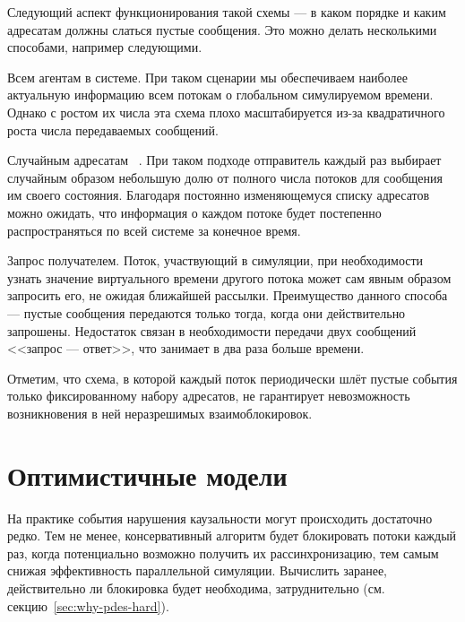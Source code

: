 Следующий аспект функционирования такой схемы — в каком порядке  и каким адресатам должны слаться пустые сообщения. Это можно делать несколькими способами, например следующими.

\begin{description*}
\item[Всем агентам в системе.] При таком сценарии мы обеспечиваем наиболее актуальную информацию всем потокам о глобальном симулируемом времени. Однако с ростом их числа эта схема плохо масштабируется из-за квадратичного роста числа передаваемых сообщений.

\item[Случайным адресатам]~\cite{graphite2010}. При таком подходе отправитель каждый раз выбирает случайным образом небольшую долю от полного числа потоков для сообщения им своего состояния. Благодаря постоянно изменяющемуся списку адресатов можно ожидать, что информация о каждом потоке будет постепенно распространяться по всей системе за конечное время.

\item[Запрос получателем.] Поток, участвующий в симуляции, при необходимости узнать значение виртуального времени другого потока может сам явным образом запросить его, не ожидая ближайшей рассылки. Преимущество данного способа — пустые сообщения передаются только тогда, когда они действительно запрошены. Недостаток связан в необходимости передачи двух сообщений <<запрос — ответ>>, что занимает в два раза больше времени.
\end{description*}

Отметим, что схема, в которой каждый поток периодически шлёт пустые события только фиксированному набору адресатов, не гарантирует невозможность возникновения в ней неразрешимых взаимоблокировок.

\section{Оптимистичные модели}


На практике события нарушения каузальности могут происходить достаточно редко. Тем не менее, консервативный алгоритм будет блокировать потоки каждый раз, когда потенциально возможно получить их рассинхронизацию, тем самым снижая эффективность параллельной симуляции. Вычислить заранее, действительно ли блокировка будет необходима, затруднительно (см. секцию~\ref{sec:why-pdes-hard}).

